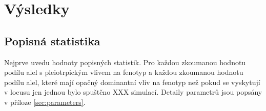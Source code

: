 \chapter{Výsledky}

%
%
%
%
%
%
%


\section{Popisná statistika}

Nejprve uvedu hodnoty popisných statistik. Pro každou zkoumanou hodnotu podílu alel s pleiotrpickým vlivem na fenotyp a
každou zkoumanou hodnotu podílu alel, které mají opačný dominantní vliv na fenotyp než pokud se vyskytují v locusu jen jednou
bylo spuštěno XXX simulací. Detaily parametrů jsou popsány v příloze \ref{sec:parameters}.

